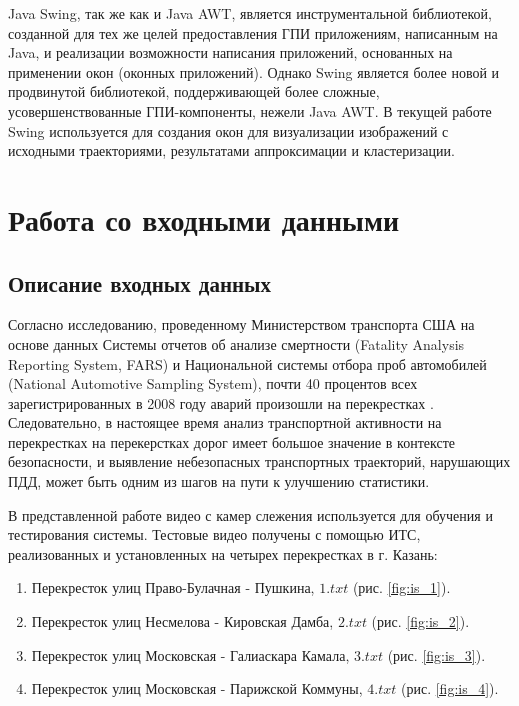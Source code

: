 Java Swing, так же как и Java AWT, является инструментальной библиотекой, созданной для тех же целей предоставления ГПИ приложениям, написанным на Java, и реализации возможности написания приложений, основанных на применении окон (оконных приложений). Однако Swing является более новой и продвинутой библиотекой, поддерживающей более сложные, усовершенствованные ГПИ-компоненты, нежели Java AWT. В текущей работе Swing используется для создания окон для визуализации изображений с исходными траекториями, результатами аппроксимации и кластеризации.

\section{Работа со входными данными}
\subsection{Описание входных данных}

Согласно исследованию, проведенному Министерством транспорта США на основе данных Системы отчетов об анализе смертности (Fatality Analysis Reporting System, FARS) и Национальной системы отбора проб автомобилей (National Automotive Sampling System), почти 40 процентов всех зарегистрированных в 2008 году аварий произошли на перекрестках \cite{inproceedings:10_cfi}. Следовательно, в настоящее время анализ транспортной активности на перекрестках на перекерстках дорог имеет большое значение в контексте безопасности, и выявление небезопасных транспортных траекторий, нарушающих ПДД, может быть одним из шагов на пути к улучшению статистики.

В представленной работе видео с камер слежения используется для обучения и тестирования системы. Тестовые видео получены с помощью ИТС, реализованных и установленных на четырех перекрестках в г. Казань:

\begin{enumerate}
	\item Перекресток улиц Право-Булачная - Пушкина, $1.txt$ (рис. \ref{fig:is_1}).
	\item Перекресток улиц Несмелова - Кировская Дамба, $2.txt$ (рис. \ref{fig:is_2}).
	\item Перекресток улиц Московская - Галиаскара Камала, $3.txt$ (рис. \ref{fig:is_3}).
	\item Перекресток улиц Московская - Парижской Коммуны, $4.txt$ (рис. \ref{fig:is_4}).
\end{enumerate}

